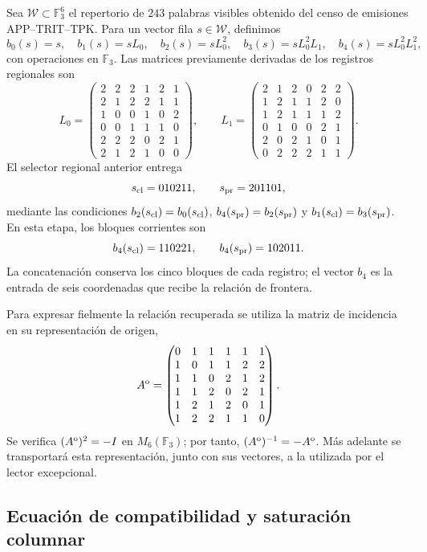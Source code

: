 Sea $\mathcal W\subset\mathbb F_3^6$ el repertorio de $243$ palabras
visibles obtenido del censo de emisiones APP--TRIT--TPK. Para un vector
fila $s\in\mathcal W$, definimos
\[
 b_0(s)=s,\quad b_1(s)=sL_0,\quad b_2(s)=sL_0^2,\quad
 b_3(s)=sL_0^2L_1,\quad b_4(s)=sL_0^2L_1^2,
\]
con operaciones en $\mathbb F_3$. Las matrices previamente derivadas de
los registros regionales son
\[
L_0=\begin{pmatrix}
2&2&2&1&2&1\\2&1&2&2&1&1\\1&0&0&1&0&2\\
0&0&1&1&1&0\\2&2&2&0&2&1\\2&1&2&1&0&0
\end{pmatrix},\qquad
L_1=\begin{pmatrix}
2&1&2&0&2&2\\1&2&1&1&2&0\\1&2&1&1&1&2\\
0&1&0&0&2&1\\2&0&2&1&0&1\\0&2&2&2&1&1
\end{pmatrix}.
\]
El selector regional anterior entrega
\[
s_{\rm cl}=010211,\qquad s_{\rm pr}=201101,
\]
mediante las condiciones
$b_2(s_{\rm cl})=b_0(s_{\rm cl})$,
$b_4(s_{\rm pr})=b_2(s_{\rm pr})$ y
$b_1(s_{\rm cl})=b_3(s_{\rm pr})$.
En esta etapa, los bloques corrientes son
\[
b_4(s_{\rm cl})=110221,\qquad
b_4(s_{\rm pr})=102011.
\]
La concatenación conserva los cinco bloques de cada registro; el vector
$b_4$ es la entrada de seis coordenadas que recibe la relación de frontera.

Para expresar fielmente la relación recuperada se utiliza la matriz de
incidencia en su representación de origen,
\begin{equation}
A^{\rm o}=\begin{pmatrix}
0&1&1&1&1&1\\1&0&1&1&2&2\\1&1&0&2&1&2\\
1&1&2&0&2&1\\1&2&1&2&0&1\\1&2&2&1&1&0
\end{pmatrix}.
\label{r36c:eq:ao}
\end{equation}
Se verifica $(A^{\rm o})^2=-I$ en $M_6(\mathbb F_3)$; por tanto,
$(A^{\rm o})^{-1}=-A^{\rm o}$. Más adelante se transportará esta
representación, junto con sus vectores, a la utilizada por el lector
excepcional.

\subsection{Ecuación de compatibilidad y saturación columnar}

